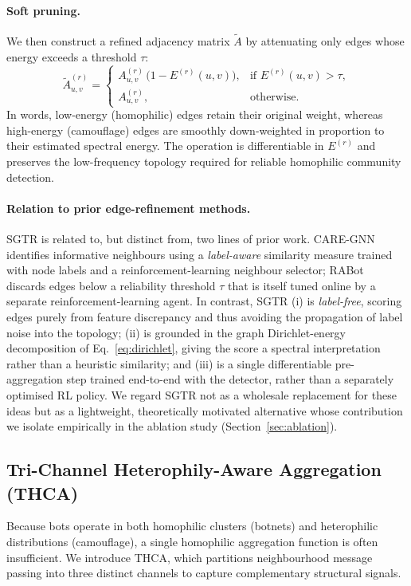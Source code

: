 \paragraph{Soft pruning.}
We then construct a refined adjacency matrix $\tilde{A}$ by attenuating only edges whose energy exceeds a threshold $\tau$:
\begin{equation}
    \tilde{A}^{(r)}_{u,v} =
    \begin{cases}
        A^{(r)}_{u,v}\,\big(1 - E^{(r)}(u,v)\big), & \text{if } E^{(r)}(u,v) > \tau,\\[4pt]
        A^{(r)}_{u,v}, & \text{otherwise.}
    \end{cases}
    \label{eq:softprune}
\end{equation}
In words, low-energy (homophilic) edges retain their original weight, whereas high-energy (camouflage) edges are smoothly down-weighted in proportion to their estimated spectral energy. The operation is differentiable in $E^{(r)}$ and preserves the low-frequency topology required for reliable homophilic community detection.

\paragraph{Relation to prior edge-refinement methods.}
SGTR is related to, but distinct from, two lines of prior work. CARE-GNN~\cite{dou2020caregnn} identifies informative neighbours using a \emph{label-aware} similarity measure trained with node labels and a reinforcement-learning neighbour selector; RABot~\cite{zhang2026rabot} discards edges below a reliability threshold $\tau$ that is itself tuned online by a separate reinforcement-learning agent. In contrast, SGTR (i) is \emph{label-free}, scoring edges purely from feature discrepancy and thus avoiding the propagation of label noise into the topology; (ii) is grounded in the graph Dirichlet-energy decomposition of Eq.~\eqref{eq:dirichlet}, giving the score a spectral interpretation rather than a heuristic similarity; and (iii) is a single differentiable pre-aggregation step trained end-to-end with the detector, rather than a separately optimised RL policy. We regard SGTR not as a wholesale replacement for these ideas but as a lightweight, theoretically motivated alternative whose contribution we isolate empirically in the ablation study (Section~\ref{sec:ablation}).

\subsection{Tri-Channel Heterophily-Aware Aggregation (THCA)}
Because bots operate in both homophilic clusters (botnets) and heterophilic distributions (camouflage), a single homophilic aggregation function is often insufficient. We introduce THCA, which partitions neighbourhood message passing into three distinct channels to capture complementary structural signals.

